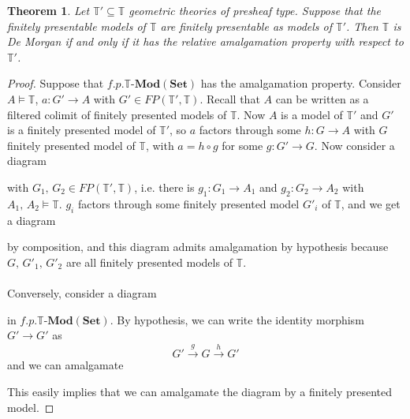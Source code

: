 \documentclass{article}
\newtheorem{theorem}{Theorem}
\newcommand{\T}{\mathbb{T}}
\newcommand{\Set}{\mathbf{Set}}
\newcommand{\Mod}{{\mathbf{Mod}}}
\begin{document}
\begin{theorem}
    Let $\T'\subseteq\T$ geometric theories of presheaf type. Suppose that the finitely presentable models of $\T$ are finitely presentable as models of $\T'$. Then $\T$ is De Morgan if and only if it has the relative amalgamation property with respect to $\T'$.
\end{theorem}
\begin{proof}
    Suppose that $f.p.\T$-$\Mod(\Set)$ has the amalgamation property. Consider $A\models\T$, $a:G'\xrightarrow{}A$ with $G'\in FP(\T',\T)$. Recall that $A$ can be written as a filtered colimit of finitely presented models of $\T$. Now $A$ is a model of $\T'$ and $G'$ is a finitely presented model of $\T'$, so $a$ factors through some $h:G\xrightarrow{}A$ with $G$ finitely presented model of $\T$, with $a=h\circ g$ for some $g:G'\xrightarrow{}G$. Now consider a diagram  
    \begin{center}
    \end{center}
    with $G_1,\, G_2\in FP(\T',\T)$, i.e. there is $g_1:G_1\xrightarrow{}A_1$ and $g_2:G_2\xrightarrow{}A_2$ with $A_1,\,A_2\models\T$. $g_i$ factors through some finitely presented model $G'_i$ of $\T$, and we get a diagram 
     \begin{center}
    \end{center}
    by composition, and this diagram admits amalgamation by hypothesis because $G,\,G'_1,\,G'_2$ are all finitely presented models of $\T$.\\
    \\
    Conversely, consider a diagram 
     \begin{center}
    \end{center}
    in $f.p.\T$-$\Mod(\Set)$. By hypothesis, we can write the identity morphism $G'\xrightarrow{}G'$ as $$G'\xrightarrow{g}G\xrightarrow{h}G'$$
    and we can amalgamate
    \begin{center}
    \end{center}
    This easily implies that we can amalgamate the diagram by a finitely presented model.
\end{proof}
\end{document}
